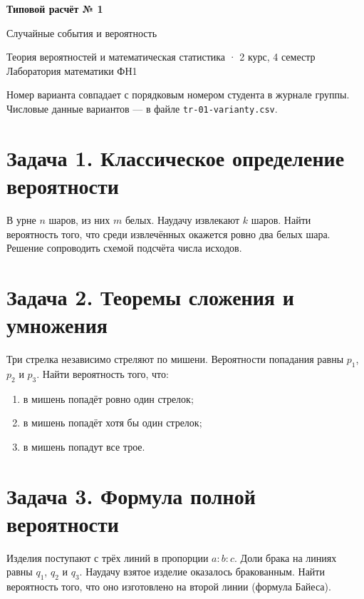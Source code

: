 \documentclass[12pt, a4paper]{article}
\begin{document}
\begin{center}
  {\large\bfseries Типовой расчёт № 1}

  \vspace{0.3em}
  {\large Случайные события и вероятность}

  \vspace{0.5em}
  {\small Теория вероятностей и математическая статистика · 2 курс, 4 семестр\\
  Лаборатория математики ФН1}
\end{center}

\vspace{1em}

\noindent
Номер варианта совпадает с порядковым номером студента в журнале группы.
Числовые данные вариантов — в файле \texttt{tr-01-varianty.csv}.

\section*{Задача 1. Классическое определение вероятности}

В урне $n$ шаров, из них $m$ белых. Наудачу извлекают $k$ шаров.
Найти вероятность того, что среди извлечённых окажется ровно два белых шара.
Решение сопроводить схемой подсчёта числа исходов.

\section*{Задача 2. Теоремы сложения и умножения}

Три стрелка независимо стреляют по мишени. Вероятности попадания равны
$p_1$, $p_2$ и $p_3$. Найти вероятность того, что:
\begin{enumerate}[label={\asbuk{enumi})}]
  \item в мишень попадёт ровно один стрелок;
  \item в мишень попадёт хотя бы один стрелок;
  \item в мишень попадут все трое.
\end{enumerate}

\section*{Задача 3. Формула полной вероятности}

Изделия поступают с трёх линий в пропорции $a : b : c$. Доли брака
на линиях равны $q_1$, $q_2$ и $q_3$. Наудачу взятое изделие оказалось
бракованным. Найти вероятность того, что оно изготовлено на второй линии
(формула Байеса).
\end{document}

